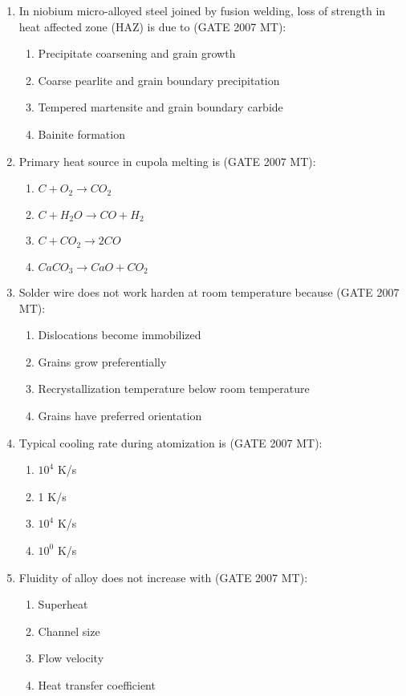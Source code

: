 \documentclass[12pt]{article}
\begin{document}
\begin{enumerate}
\item In niobium micro-alloyed steel joined by fusion welding, loss of strength in heat affected zone (HAZ) is due to (GATE 2007 MT):
    \begin{enumerate}
        \item Precipitate coarsening and grain growth
        \item Coarse pearlite and grain boundary precipitation
        \item Tempered martensite and grain boundary carbide
        \item Bainite formation
    \end{enumerate}

\item Primary heat source in cupola melting is (GATE 2007 MT):
    \begin{enumerate}
        \item $C + O_2 \rightarrow CO_2$
        \item $C + H_2O \rightarrow CO + H_2$
        \item $C + CO_2 \rightarrow 2CO$
        \item $CaCO_3 \rightarrow CaO + CO_2$
    \end{enumerate}

\item Solder wire does not work harden at room temperature because (GATE 2007 MT):
    \begin{enumerate}
        \item Dislocations become immobilized
        \item Grains grow preferentially
        \item Recrystallization temperature below room temperature
        \item Grains have preferred orientation
    \end{enumerate}

\item Typical cooling rate during atomization is (GATE 2007 MT):
    \begin{enumerate}
        \item $10^{4}$ K/s
        \item 1 K/s
        \item $10^{4}$ K/s
        \item $10^{0}$ K/s
    \end{enumerate}

\item Fluidity of alloy does not increase with (GATE 2007 MT):
    \begin{enumerate}
        \item Superheat
        \item Channel size
        \item Flow velocity
        \item Heat transfer coefficient
    \end{enumerate}


\end{enumerate}
\end{document}
